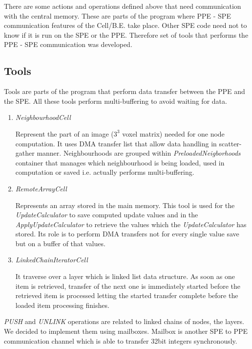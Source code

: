 
\par
There are some actions and operations defined above that need communication with the central memory.
These are parts of the program where PPE - SPE communication features of the \mbox{Cell/B.E.} take place.
Other SPE code need not to know if it is run on the SPE or the PPE.
Therefore set of tools that performs the PPE - SPE communication was developed.

\subsection{Tools}
Tools are parts of the program that perform data transfer between the PPE and the SPE.
All these tools perform multi-buffering to avoid waiting for data.\\

\begin{enumerate}
\item \emph{NeighbourhoodCell}
\par
Represent the part of an image ($3^3$ voxel matrix) needed for one node computation.
It uses DMA transfer list that allow data handling in scatter-gather manner.
Neighbourhoods are grouped within \mbox{\emph{PreloadedNeigborhoods}} container that manages which neighbourhood is being loaded, used in computation or saved i.e. actually performs multi-buffering.

\item \emph{RemoteArrayCell}
\par
Represents an array stored in the main memory.
This tool is used for the \mbox{\emph{UpdateCalculator}} to save computed update values and in the \mbox{\emph{ApplyUpdateCalculator}} to retrieve the values which the \mbox{\emph{UpdateCalculator}} has stored.
Its role is to perform DMA transfers not for every single value save but on a buffer of that values.

\item \emph{LinkedChainIteratorCell}
\par
It traverse over a layer which is linked list data structure.
As soon as one item is retrieved, transfer of the next one is immediately started before the retrieved item is processed letting the started transfer complete before the loaded item processing finishes.
\end{enumerate}

\par
\emph{PUSH} and \emph{UNLINK} operations are related to linked chains of nodes, the layers.
We decided to implement them using mailboxes.
Mailbox is another SPE to PPE communication channel which is able to transfer 32bit integers synchronously.

